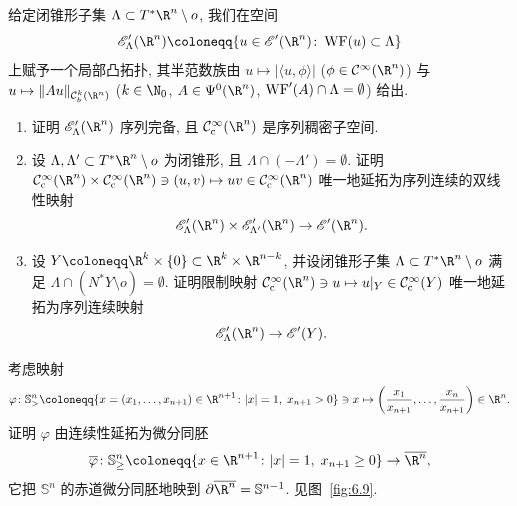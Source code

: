 \begin{exer}[乘法与限制映射的唯一性]\label{ex:6.15}
给定闭锥形子集 $\Lambda \subset T^* \R^n \setminus o$, 我们在空间
\begin{equation}\label{eq:6.130}
    \mathscr{E}'_\Lambda(\R^n) \defeq \{u \in \mathscr{E}'(\R^n) \colon \WF(u) \subset \Lambda\}
\end{equation}
上赋予一个局部凸拓扑, 其半范数族由 $u \mapsto |\langle u, \phi \rangle|$ ($\phi \in \Smooth(\R^n)$) 与 $u \mapsto \|A u\|_{\mathcal{C}^k_b(\R^n)}$ ($k \in \N_0$, $A \in \Psi^0(\R^n)$, $\operatorname{WF}'(A) \cap \Lambda = \emptyset$) 给出.
\begin{enumerate}
    \item 证明 $\mathscr{E}'_\Lambda(\R^n)$ 序列完备, 且 $\SmoothComp(\R^n)$ 是序列稠密子空间.
    \item 设 $\Lambda, \Lambda' \subset T^* \R^n \setminus o$ 为闭锥形, 且 $\Lambda \cap (-\Lambda') = \emptyset$. 证明 $\SmoothComp(\R^n) \times \SmoothComp(\R^n) \ni (u, v) \mapsto u v \in \SmoothComp(\R^n)$ 唯一地延拓为序列连续的双线性映射
    \begin{equation}\label{eq:6.131}
        \mathscr{E}'_\Lambda(\R^n) \times \mathscr{E}'_{\Lambda'}(\R^n) \to \mathscr{E}'(\R^n).
    \end{equation}
    \item 设 $Y \defeq \R^k \times \{0\} \subset \R^k \times \R^{n-k}$, 并设闭锥形子集 $\Lambda \subset T^* \R^n \setminus o$ 满足 $\Lambda \cap (N^* Y \setminus o) = \emptyset$. 证明限制映射 $\SmoothComp(\R^n) \ni u \mapsto u|_Y \in \SmoothComp(Y)$ 唯一地延拓为序列连续映射
    \begin{equation}\label{eq:6.132}
        \mathscr{E}'_\Lambda(\R^n) \to \mathscr{E}'(Y).
    \end{equation}
\end{enumerate}
\end{exer}

\begin{exer}[球极投影与径向紧化]\label{ex:6.16}
考虑映射
\begin{equation}\label{eq:6.133}
    \varphi \colon \mathbb{S}^n_{>} \defeq \{x = (x_1, \ldots, x_{n+1}) \in \R^{n+1} \colon |x| = 1, \; x_{n+1} > 0\} \ni x \mapsto \left( \frac{x_1}{x_{n+1}}, \ldots, \frac{x_n}{x_{n+1}} \right) \in \R^n.
\end{equation}
证明 $\varphi$ 由连续性延拓为微分同胚
\begin{equation}\label{eq:6.134}
    \overline{\varphi} \colon \mathbb{S}^n_{\ge} \defeq \{x \in \R^{n+1} \colon |x| = 1, \; x_{n+1} \ge 0\} \to \overline{\R^n},
\end{equation}
它把 $\mathbb{S}^n$ 的赤道微分同胚地映到 $\partial\overline{\R^n} = \mathbb{S}^{n-1}$. 见图~\ref{fig:6.9}.
\end{exer}

